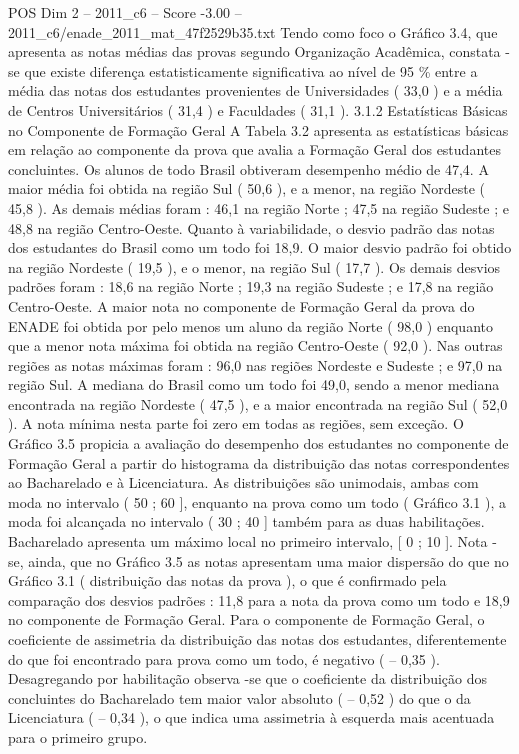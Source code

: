 \begin{textsample}{POS Dim 2 – 2011\_c6 – Score -3.00 – 2011\_c6/enade\_2011\_mat\_47f2529b35.txt}
Tendo como foco o Gráfico 3.4, que apresenta as notas médias das provas segundo Organização Acadêmica, constata -se que existe diferença estatisticamente significativa ao nível de 95 \% entre a média das notas dos estudantes provenientes de Universidades ( 33,0 ) e a média de Centros Universitários ( 31,4 ) e Faculdades ( 31,1 ). 3.1.2 Estatísticas Básicas no Componente de Formação Geral A Tabela 3.2 apresenta as estatísticas básicas em relação ao componente da prova que avalia a Formação Geral dos estudantes concluintes.
Os alunos de todo Brasil obtiveram desempenho médio de 47,4.
A maior média foi obtida na região Sul ( 50,6 ), e a menor, na região Nordeste ( 45,8 ).
As demais médias foram : 46,1 na região Norte ; 47,5 na região Sudeste ; e 48,8 na região Centro-Oeste.
Quanto à variabilidade, o desvio padrão das notas dos estudantes do Brasil como um todo foi 18,9.
O maior desvio padrão foi obtido na região Nordeste ( 19,5 ), e o menor, na região Sul ( 17,7 ).
Os demais desvios padrões foram : 18,6 na região Norte ; 19,3 na região Sudeste ; e 17,8 na região Centro-Oeste.
A maior nota no componente de Formação Geral da prova do ENADE foi obtida por pelo menos um aluno da região Norte ( 98,0 ) enquanto que a menor nota máxima foi obtida na região Centro-Oeste ( 92,0 ).
Nas outras regiões as notas máximas foram : 96,0 nas regiões Nordeste e Sudeste ; e 97,0 na região Sul.
A mediana do Brasil como um todo foi 49,0, sendo a menor mediana encontrada na região Nordeste ( 47,5 ), e a maior encontrada na região Sul ( 52,0 ).
A nota mínima nesta parte foi zero em todas as regiões, sem exceção.
O Gráfico 3.5 propicia a avaliação do desempenho dos estudantes no componente de Formação Geral a partir do histograma da distribuição das notas correspondentes ao Bacharelado e à Licenciatura.
As distribuições são unimodais, ambas com moda no intervalo ( 50 ; 60 ], enquanto na prova como um todo ( Gráfico 3.1 ), a moda foi alcançada no intervalo ( 30 ; 40 ] também para as duas habilitações.
Bacharelado apresenta um máximo local no primeiro intervalo, [ 0 ; 10 ].
Nota -se, ainda, que no Gráfico 3.5 as notas apresentam uma maior dispersão do que no Gráfico 3.1 ( distribuição das notas da prova ), o que é confirmado pela comparação dos desvios padrões : 11,8 para a nota da prova como um todo e 18,9 no componente de Formação Geral.
Para o componente de Formação Geral, o coeficiente de assimetria da distribuição das notas dos estudantes, diferentemente do que foi encontrado para prova como um todo, é negativo ( – 0,35 ).
Desagregando por habilitação observa -se que o coeficiente da distribuição dos concluintes do Bacharelado tem maior valor absoluto ( – 0,52 ) do que o da Licenciatura ( – 0,34 ), o que indica uma assimetria à esquerda mais acentuada para o primeiro grupo.

\end{textsample}
